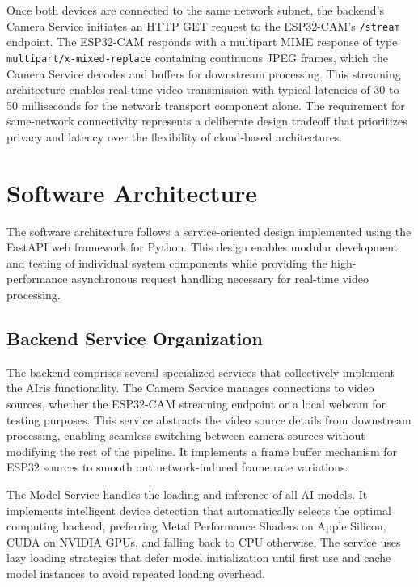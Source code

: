 \documentclass[12pt,a4paper]{report}
\begin{document}
Once both devices are connected to the same network subnet, the backend's Camera Service initiates an HTTP GET request to the ESP32-CAM's \texttt{/stream} endpoint. The ESP32-CAM responds with a multipart MIME response of type \texttt{multipart/x-mixed-replace} containing continuous JPEG frames, which the Camera Service decodes and buffers for downstream processing. This streaming architecture enables real-time video transmission with typical latencies of 30 to 50 milliseconds for the network transport component alone. The requirement for same-network connectivity represents a deliberate design tradeoff that prioritizes privacy and latency over the flexibility of cloud-based architectures.

\section{Software Architecture}

The software architecture follows a service-oriented design implemented using the FastAPI web framework for Python. This design enables modular development and testing of individual system components while providing the high-performance asynchronous request handling necessary for real-time video processing.

\subsection{Backend Service Organization}

The backend comprises several specialized services that collectively implement the AIris functionality. The Camera Service manages connections to video sources, whether the ESP32-CAM streaming endpoint or a local webcam for testing purposes. This service abstracts the video source details from downstream processing, enabling seamless switching between camera sources without modifying the rest of the pipeline. It implements a frame buffer mechanism for ESP32 sources to smooth out network-induced frame rate variations.

The Model Service handles the loading and inference of all AI models. It implements intelligent device detection that automatically selects the optimal computing backend, preferring Metal Performance Shaders on Apple Silicon, CUDA on NVIDIA GPUs, and falling back to CPU otherwise. The service uses lazy loading strategies that defer model initialization until first use and cache model instances to avoid repeated loading overhead.
\end{document}

